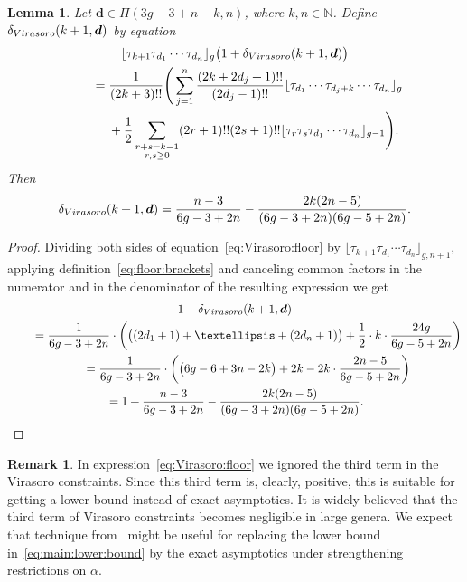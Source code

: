 \documentclass[11pt]{article}
\newcommand\N{\mathbb N}
\newtheorem{Lemma}[Theorem]{Lemma}
\theoremstyle{definition}
\newtheorem{Remark}[Theorem]{Remark}
\begin{document}
\begin{Lemma}\label{lm:Virasoro}
Let $\boldsymbol{d}\in\Pi(3g-3+n-k,n)$, where $k,n\in\N$.
Define $\delta_{\rm Virasoro}(k+1,\boldsymbol{d})$
by equation
\begin{gather}
\lfloor\tau_{k+1}\tau_{d_1}\cdots\tau_{d_n}\rfloor_g
\big(1+\delta_{\rm Virasoro}(k+1,\boldsymbol{d})\big)
\nonumber\\
\qquad{} =\frac{1}{(2k+3)!!}
\Bigg(\sum_{j=1}^n
\frac{(2k+2d_j+1)!!}{(2d_j-1)!!}\lfloor\tau_{d_1}\cdots
\tau_{d_{j}+k}\cdots\tau_{d_n}\rfloor_g\nonumber\\
\qquad\quad{} +\frac{1}{2}\sum_{\substack{r+s=k-1\\r,s\ge 0}}
(2r+1)!!(2s+1)!!\lfloor\tau_r\tau_s\tau_{d_1}\cdots\tau_{d_n}\rfloor_{g-1}\Bigg) .\label{eq:Virasoro:floor}
\end{gather}
Then
\begin{gather}\label{eq:delta:Virasoro}
\delta_{\rm Virasoro}(k+1,\boldsymbol{d})
=\frac{n-3}{6g-3+2n}-\frac{2k(2n-5)}{(6g-3+2n)(6g-5+2n)} .
\end{gather}
\end{Lemma}

\begin{proof}Dividing both sides of equation~\eqref{eq:Virasoro:floor} by
$\lfloor \tau_{k+1}\tau_{d_1} \cdots \tau_{d_n}\rfloor_{g,n+1}$,
applying definition~\eqref{eq:floor:brackets}
and canceling common factors in the numerator and in the denominator
of the resulting expression we get
\begin{gather*}
1+\delta_{\rm Virasoro}(k+1,\boldsymbol{d})\\
\qquad{} =
\frac{1}{6g-3+2n}\cdot\left(
\big((2d_1+1)+\dots+(2d_n+1)\big)
+\frac{1}{2}\cdot k\cdot \frac{24g}{6g-5+2n}\right) \\
 \qquad{} =\frac{1}{6g-3+2n}\cdot\left(
\big(6g-6+3n-2k\big)+2k-2k\cdot\frac{2n-5}{6g-5+2n}\right)\\
\qquad{} = 1+\frac{n-3}{6g-3+2n}-\frac{2k(2n-5)}{(6g-3+2n)(6g-5+2n)} .\tag*{\qed}
\end{gather*}\renewcommand{\qed}{}
\end{proof}

\begin{Remark}\label{rm:lower:bound:Virasoro}
In expression~\eqref{eq:Virasoro:floor} we ignored the third term in the Virasoro constraints. Since this third term is, clearly, positive,
this is suitable for getting a lower bound
instead of exact asymptotics.
It is widely believed that the third term
of Virasoro constraints becomes negligible in large genera. We expect that technique from~\cite{Aggarwal:Siegel:Veech} might be useful for replacing
the lower bound in~\eqref{eq:main:lower:bound} by the exact asymptotics
under strengthening restrictions on $\alpha$.
\end{Remark}
\end{document}
